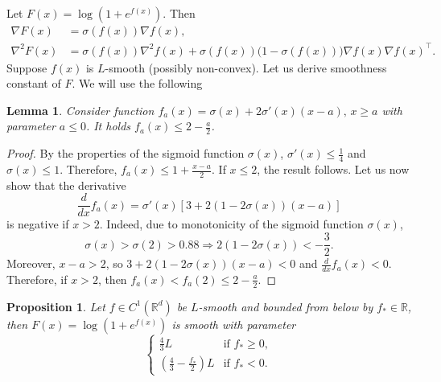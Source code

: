 \documentclass{article}
\newcommand{\R}{\mathbb{R}}
\theoremstyle{plain}
\newtheorem{proposition}[theorem]{Proposition}
\newtheorem{lemma}[theorem]{Lemma}
\theoremstyle{definition}
\theoremstyle{remark}
\begin{document}
Let \( F(x) = \log (1 + e^{f(x)}) \). Then
\begin{align}
    \nabla F(x) &= \sigma(f(x)) \nabla f(x), \\
    \nabla^2 F(x) &= \sigma(f(x)) \nabla^2 f(x) + \sigma(f(x)) \bigl( 1 - \sigma(f(x))\bigr) \nabla f(x) \nabla f(x)^\top.
    \label{eq:softplus_hessian}
\end{align}
Suppose \( f(x) \) is \(L\)-smooth (possibly non-convex). Let us derive smoothness constant of \(F\). We will use the following
\begin{lemma}\label{lem:lm1}
    Consider function \( f_a(x)=\sigma(x) + 2 \sigma'(x)(x-a),\, x\geq a \) with parameter \(a\leq 0\). It holds \( f_a(x) \leq 2-\frac{a}{2} \).
\end{lemma}
\begin{proof}
    By the properties of the sigmoid function $\sigma(x)$, \(\sigma'(x)\leq \frac{1}{4}\) and \(\sigma(x)\leq 1\). Therefore, \( f_a(x)\leq 1 + \frac{x-a}{2} \). If \(x \leq 2 \), the result follows. Let us now show that the derivative
    \[
    	\frac{d}{dx}f_a(x) = \sigma'(x)[3 + 2 (1-2\sigma(x))(x-a)]
    \]
    is negative if \(x > 2\). Indeed, due to monotonicity of the sigmoid function $\sigma(x)$,
    \[
    	\sigma(x) > \sigma(2) > 0.88 \Rightarrow 2 (1-2\sigma(x)) < -\frac{3}{2}.
    \]
    Moreover, \( x-a > 2 \), so \(3 + 2 (1-2\sigma(x))(x-a) < 0\) and \( \frac{d}{dx}f_a(x)<0 \). Therefore, if \(x > 2\), then \( f_a(x) < f_a(2) \leq 2-\frac{a}{2} \).
\end{proof}

\begin{proposition}\label{prop:softplus_smooth}
    Let \( f \in C^1(\R^d) \) be \(L\)-smooth and bounded from below by $f_* \in \R$,
    then \( F(x) = \log (1 + e^{f(x)}) \) is smooth with parameter
    \begin{equation}\label{eq:softplus_L}
        \begin{cases}
            \frac{4}{3} L & \text{if } f_* \geq 0, \\
            \left(\frac{4}{3} - \frac{f_*}{2} \right) L & \text{if } f_* < 0 .
        \end{cases}
    \end{equation}
\end{proposition}
\end{document}
